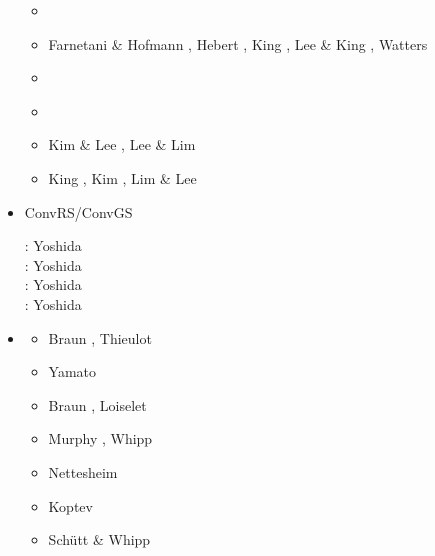 \begin{itemize}
\begin{scriptsize}
\begin{itemize}
\item[\twothousandeight] \cite{hash08}
\item[\twothousandnine] Farnetani \& Hofmann \cite{faho09}, Hebert \etal \cite{heaa09}, King \cite{king09}, 
                  Lee \& King \cite{leki09}, Watters \etal \cite{wazh09}
\item[\twothousandten] \cite{kilv10}\cite{cows10}\cite{hash10}\cite{leki10}
\item[\twothousandeleven] \cite{hash11}\cite{leki11}
\item[\twothousandfourteen] Kim \& Lee \cite{kile14}, Lee \& Lim \cite{leli14}
\item[\twothousandfifteen] King \etal \cite{kifr15}, Kim \etal \cite{kilk15}, Lim \& Lee \cite{lile15}
\end{itemize}
\end{scriptsize}

\item {\codefont ConvRS/ConvGS} 

\begin{scriptsize}
\noindent
\twothousandeight:
Yoshida \cite{yosh08}\\
\twothousandtwelve:
Yoshida \etal \cite{yoth12}\\
\twothousandthirteen:
Yoshida \cite{yosh13} \\
\twothousandtwenty:
Yoshida \etal \cite{yosy20}
\end{scriptsize} 

\item \douar {}

\begin{scriptsize}
\begin{itemize}
\item[\twothousandeight] Braun \etal  \cite{brtf08}, Thieulot \etal  \cite{thfb08}
\item[\twothousandnine] Yamato \etal  \cite{yahb09}
\item[\twothousandten] Braun \etal \cite{brya10}, Loiselet \etal \cite{lobh10}
\item[\twothousandfourteen] Murphy \etal \cite{mutg14}, Whipp \etal \cite{whbb14}
\item[\twothousandeighteen] Nettesheim \etal \cite{neew18}
\item[\twothousandnineteen] Koptev \etal \cite{koen19}
\item[\twothousandtwenty] Sch{\"u}tt \& Whipp \cite{scwh20}
\end{itemize}
\end{scriptsize} 


\end{itemize}
